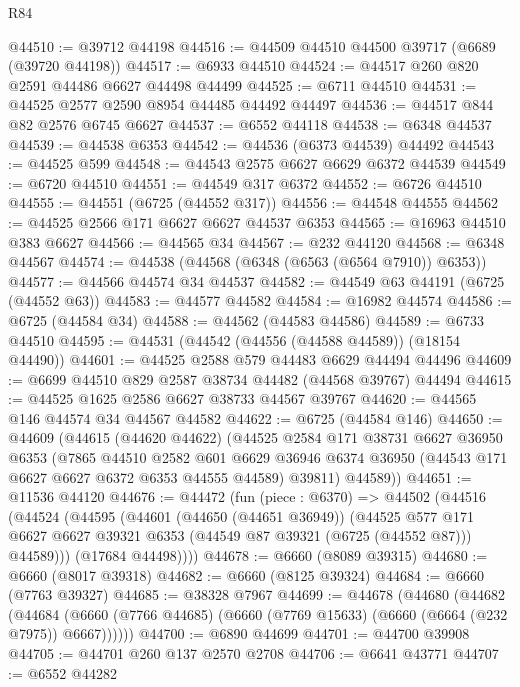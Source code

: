 \begin{lexlean}{R84}
\begin{coremodule}
@44510 := @39712 @44198
@44516 := @44509 @44510 @44500 @39717 (@6689 (@39720 @44198))
@44517 := @6933 @44510
@44524 := @44517 @260 @820 @2591 @44486 @6627 @44498 @44499
@44525 := @6711 @44510
@44531 := @44525 @2577 @2590 @8954 @44485 @44492 @44497
@44536 := @44517 @844 @82 @2576 @6745 @6627
@44537 := @6552 @44118
@44538 := @6348 @44537
@44539 := @44538 @6353
@44542 := @44536 (@6373 @44539) @44492
@44543 := @44525 @599
@44548 := @44543 @2575 @6627 @6629 @6372 @44539
@44549 := @6720 @44510
@44551 := @44549 @317 @6372
@44552 := @6726 @44510
@44555 := @44551 (@6725 (@44552 @317))
@44556 := @44548 @44555
@44562 := @44525 @2566 @171 @6627 @6627 @44537 @6353
@44565 := @16963 @44510 @383 @6627
@44566 := @44565 @34
@44567 := @232 @44120
@44568 := @6348 @44567
@44574 := @44538 (@44568 (@6348 (@6563 (@6564 @7910)) @6353))
@44577 := @44566 @44574 @34 @44537
@44582 := @44549 @63 @44191 (@6725 (@44552 @63))
@44583 := @44577 @44582
@44584 := @16982 @44574
@44586 := @6725 (@44584 @34)
@44588 := @44562 (@44583 @44586)
@44589 := @6733 @44510
@44595 := @44531 (@44542 (@44556 (@44588 @44589)) (@18154 @44490))
@44601 := @44525 @2588 @579 @44483 @6629 @44494 @44496
@44609 := @6699 @44510 @829 @2587 @38734 @44482 (@44568 @39767) @44494
@44615 := @44525 @1625 @2586 @6627 @38733 @44567 @39767
@44620 := @44565 @146 @44574 @34 @44567 @44582
@44622 := @6725 (@44584 @146)
@44650 := @44609
    (@44615
      (@44620 @44622)
      (@44525
        @2584
        @171
        @38731
        @6627
        @36950
        @6353
        (@7865
          @44510
          @2582
          @601
          @6629
          @36946
          @6374
          @36950
          (@44543 @171 @6627 @6627 @6372 @6353 @44555 @44589)
          @39811)
        @44589))
@44651 := @11536 @44120
@44676 := @44472
    (fun (piece : @6370) =>
    @44502
      (@44516
        (@44524
          (@44595
            (@44601
              (@44650 (@44651 @36949))
              (@44525
                @577
                @171
                @6627
                @6627
                @39321
                @6353
                (@44549 @87 @39321 (@6725 (@44552 @87)))
                @44589)))
          (@17684 @44498))))
@44678 := @6660 (@8089 @39315)
@44680 := @6660 (@8017 @39318)
@44682 := @6660 (@8125 @39324)
@44684 := @6660 (@7763 @39327)
@44685 := @38328 @7967
@44699 := @44678
    (@44680
      (@44682
        (@44684 (@6660 (@7766 @44685) (@6660 (@7769 @15633) (@6660 (@6664 (@232 @7975)) @6667))))))
@44700 := @6890 @44699
@44701 := @44700 @39908
@44705 := @44701 @260 @137 @2570 @2708
@44706 := @6641 @43771
@44707 := @6552 @44282

\end{coremodule}
\end{lexlean}
